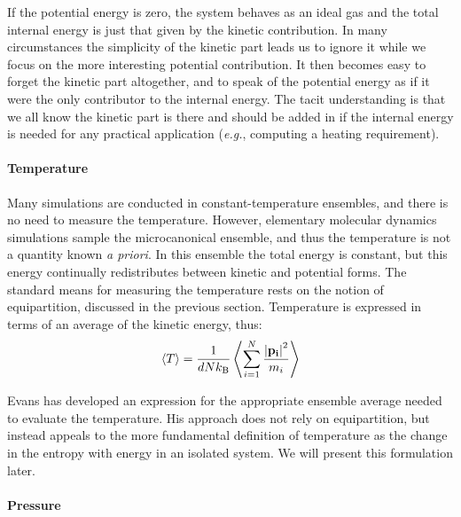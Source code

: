 \documentclass[]{article}
\let\oldparagraph\paragraph
\renewcommand{\paragraph}[1]{\oldparagraph{#1}\mbox{}}
\begin{document}
If the potential energy is zero, the system behaves as an ideal gas and
the total internal energy is just that given by the kinetic
contribution. In many circumstances the simplicity of the kinetic part
leads us to ignore it while we focus on the more interesting potential
contribution. It then becomes easy to forget the kinetic part
altogether, and to speak of the potential energy as if it were the only
contributor to the internal energy. The tacit understanding is that we
all know the kinetic part is there and should be added in if the
internal energy is needed for any practical application (\emph{e.g.},
computing a heating requirement).

\paragraph{Temperature}\label{temperature}

Many simulations are conducted in constant-temperature ensembles, and
there is no need to measure the temperature. However, elementary
molecular dynamics simulations sample the microcanonical ensemble, and
thus the temperature is not a quantity known \emph{a priori}. In this
ensemble the total energy is constant, but this energy continually
redistributes between kinetic and potential forms. The standard means
for measuring the temperature rests on the notion of equipartition,
discussed in the previous section. Temperature is expressed in terms of
an average of the kinetic energy, thus:
\[\left\langle T \right\rangle  = \frac{1}{dNk_{\rm B}}\left\langle {\sum\limits_{i = 1}^N \frac{\left| \bf{p}_i \right|^2} {m_i}} \right\rangle \]

Evans has developed an expression for the appropriate ensemble
average needed to evaluate the temperature. His approach does not rely
on equipartition, but instead appeals to the more fundamental definition
of temperature as the change in the entropy with energy in an isolated
system. We will present this formulation later.

\paragraph{Pressure}\label{pressure}
\end{document}
